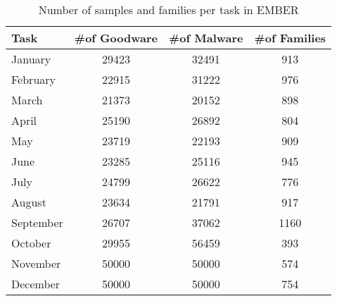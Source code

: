 
\begin{table}
\scriptsize
\centering
\caption{Number of samples and families per task in EMBER}
\begin{tabular}{l|c|c|c} 
\textbf{Task} & \textbf{\#of Goodware} & \textbf{\#of Malware} & \textbf{\#of Families}\\ 
\hline

January     &   29423   &   32491    &  913       \\
February    &   22915   &   31222    &  976      \\
March       &   21373   &   20152    &  898      \\
April       &   25190   &   26892    &  804      \\
May         &   23719   &   22193    &  909      \\
June        &   23285   &   25116    &  945      \\
July        &   24799   &   26622    &  776      \\
August      &   23634   &   21791    &  917      \\
September   &   26707   &   37062    &  1160      \\
October     &   29955   &   56459    &  393      \\
November    &   50000   &   50000    &  574      \\
December    &   50000   &   50000    &  754      \\

\bottomrule

\end{tabular}
\label{ember_task_family_stat}
\vskip -0.4cm   
\end{table}
